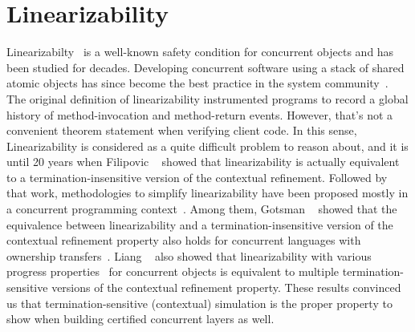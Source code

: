 \section{Linearizability}
Linearizabilty~\cite{herlihy90}  is a well-known safety condition for concurrent objects 
and has been studied for decades. 
Developing concurrent software using a stack of shared atomic objects has since
become the best practice in the system
community~\cite{Herlihy08book,ospp11}. 
The original definition of linearizability instrumented programs
to record a global history of method-invocation and method-return
events. However, that's not a convenient theorem statement when
verifying client code.
In this sense,
Linearizability is considered as a quite 
difficult problem to reason about, and it is until 20 years when 
Filipovic \etal~\cite{filipovic10} showed that linearizability is actually equivalent
to a termination-insensitive version of the contextual refinement.
Followed by that work, methodologies to simplify linearizability have been
proposed mostly in a concurrent programming context~\cite{Elmas10tacas,
Liang13pldi,Gotsman12concur,Viktor10CAV}.
Among them, Gotsman \etal~\cite{Gotsman12concur} showed that the equivalence between linearizability and a termination-insensitive version of the contextual refinement property also
holds for concurrent languages with ownership transfers~\cite{ohearn:concur04}.  
Liang \etal~\cite{liang13,lili16} also showed that linearizability with various
progress properties~\cite{Herlihy08book} for concurrent objects is
equivalent to multiple termination-sensitive versions of the contextual refinement property. 
These results convinced us that 
termination-sensitive (contextual) simulation is the proper property to show
when building certified
concurrent layers as well.


